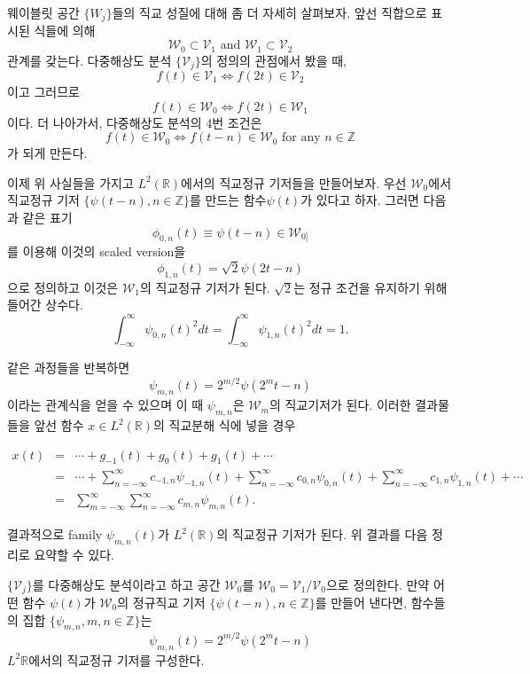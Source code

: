 \documentclass[b5paper,]{scrbook}
\theoremstyle{plain}
\theoremstyle{definition}
\numberwithin{equation}{section}
\let\BeginKnitrBlock\begin \let\EndKnitrBlock\end
\begin{document}
웨이블릿 공간 \(\{ W_{j} \}\)들의 직교 성질에 대해 좀 더 자세히 살펴보자. 앞선 직합으로 표시된 식들에 의해
\[\mathcal{W}_{0}\subset \mathcal{V}_{1} \text{ and } \mathcal{W}_{1} \subset \mathcal{V}_{2}\]
관계를 갖는다. 다중해상도 분석 \(\{\mathcal{V}_{j}\}\)의 정의의 관점에서 봤을 때,
\[f(t)\in \mathcal{V}_{1} \Longleftrightarrow f(2t)\in \mathcal{V}_{2}\]
이고 그러므로
\[f(t)\in \mathcal{W}_{0} \Longleftrightarrow f(2t)\in \mathcal{W}_{1}\]
이다. 더 나아가서, 다중해상도 분석의 4번 조건은
\[f(t)\in \mathcal{W}_{0} \Longleftrightarrow f(t-n)\in\mathcal{W}_{0} \text{ for any } n\in\mathbb{Z}\]
가 되게 만든다.

이제 위 사실들을 가지고 \(L^{2}(\mathbb{R})\)에서의 직교정규 기저들을 만들어보자. 우선 \(\mathcal{W}_{0}\)에서 직교정규 기저 \(\{\psi(t-n),n\in\mathbb{Z}\}\)를 만드는 함수\(\psi(t)\)가 있다고 하자. 그러면 다음과 같은 표기
\[\phi_{0,n}(t)\equiv\psi(t-n)\in\mathcal{W}_{0]}\]
를 이용해 이것의 scaled version을
\[\phi_{1,n}(t)=\sqrt{2}\psi(2t-n)\]
으로 정의하고 이것은 \(\mathcal{W}_{1}\)의 직교정규 기저가 된다. \(\sqrt{2}\)는 정규 조건을 유지하기 위해 들어간 상수다.
\[\int_{-\infty}^{\infty}\psi_{0,n}(t)^{2}dt=\int_{-\infty}^{\infty}\psi_{1,n}(t)^{2}dt=1.\]

같은 과정들을 반복하면
\[\psi_{m,n}(t)=2^{m/2}\psi(2^{m}t-n)\]
이라는 관계식을 얻을 수 있으며 이 때 \(\psi_{m,n}\)은 \(\mathcal{W}_{m}\)의 직교기저가 된다. 이러한 결과물들을 앞선 함수 \(x\in L^{2}(\mathbb{R})\)의 직교분해 식에 넣을 경우

\begin{eqnarray*}
x(t)&=& \cdots + g_{-1}(t)+g_{0}(t)+g_{1}(t)+\cdots\\
&=&\cdots + \sum_{n=-\infty}^{\infty}c_{-1,n}\psi_{-1,n}(t)+\sum_{n=-\infty}^{\infty}c_{0,n}\psi_{0,n}(t) + \sum_{n=-\infty}^{\infty}c_{1,n}\psi_{1,n}(t)+\cdots \\
&=&\sum_{m=-\infty}^{\infty}\sum_{n=-\infty}^{\infty}c_{m,n}\psi_{m,n}(t).
\end{eqnarray*}

결과적으로 family \(\psi_{m,n}(t)\)가 \(L^{2}(\mathbb{R})\)의 직교정규 기저가 된다. 위 결과를 다음 정리로 요약할 수 있다.

\BeginKnitrBlock{theorem}[직교정규 기저의 구성]
\protect\hypertarget{thm:unnamed-chunk-263}{}{\label{thm:unnamed-chunk-263} {} }\(\{ \mathcal{V}_{j}\}\)를 다중해상도 분석이라고 하고 공간 \(\mathcal{W}_{0}\)를 \(\mathcal{W}_{0}=\mathcal{V}_{1}/\mathcal{V}_{0}\)으로 정의한다. 만약 어떤 함수 \(\psi(t)\)가 \(\mathcal{W}_{0}\)의 정규직교 기저 \(\{ \psi(t-n),n\in\mathbb{Z}\}\)를 만들어 낸다면, 함수들의 집합 \(\{\psi_{m,n},m,n\in\mathbb{Z}\}\)는
\[\psi_{m,n}(t)=2^{m/2}\psi(2^{m}t-n)\]
\(L^2{\mathbb{R}}\)에서의 직교정규 기저를 구성한다.
\EndKnitrBlock{theorem}
\end{document}
